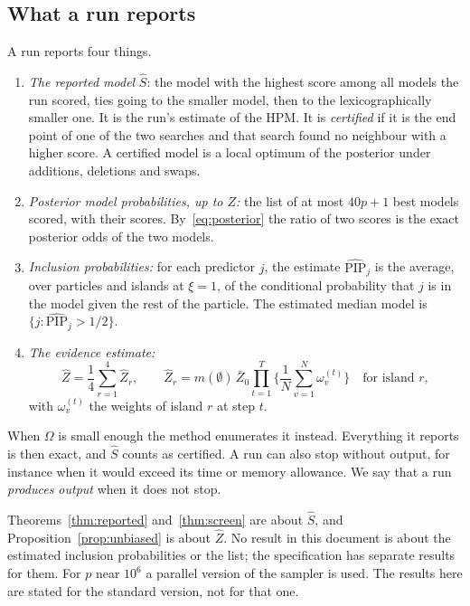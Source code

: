 \documentclass[11pt]{article}
\newcommand{\Om}{\Omega}
\newcommand{\PIP}{\mathrm{PIP}}
\newcommand{\HPM}{\mathrm{HPM}}
\newcommand{\Shat}{\hat S}
\newcommand{\Zhat}{\hat Z}
\theoremstyle{plain}
\theoremstyle{definition}
\begin{document}
\subsection{What a run reports}\label{sec:outputs}

A run reports four things.
\begin{enumerate}[label=(\roman*)]
  \item \emph{The reported model} $\Shat$: the model with the highest score among all models the run scored, ties going
    to the smaller model, then to the lexicographically smaller one. It is the run's estimate of the $\HPM$. It is \emph{certified} if it is the end point of one of
    the two searches and that search found no neighbour with a higher score. A certified model is a local optimum of
    the posterior under additions, deletions and swaps.
  \item \emph{Posterior model probabilities, up to $Z$:} the list of at most $40p+1$ best models scored, with their scores.
    By~\eqref{eq:posterior} the ratio of two scores is the exact posterior odds of the two models.
  \item \emph{Inclusion probabilities:} for each predictor $j$, the estimate $\widehat{\PIP}_j$ is the average, over
    particles and islands at $\xi=1$, of the conditional probability that $j$ is in the model given the rest of the
    particle. The estimated median model is $\{j:\widehat{\PIP}_j>1/2\}$.
  \item \emph{The evidence estimate:}
    \begin{equation}\label{eq:zhat}
      \Zhat=\frac14\sum_{r=1}^{4}\Zhat_r,\qquad
      \Zhat_r=m(\emptyset)\,\bar Z_0\prod_{t=1}^{T}\Big\{\frac1N\sum_{v=1}^N\omega^{(t)}_v\Big\}\quad\text{for island }r,
    \end{equation}
    with $\omega^{(t)}_v$ the weights of island $r$ at step $t$.
\end{enumerate}
When $\Om$ is small enough the method enumerates it instead. Everything it reports is then exact, and $\Shat$ counts as
certified. A run can also stop without output, for instance when it would exceed its time or memory allowance. We say
that a run \emph{produces output} when it does not stop.

Theorems~\ref{thm:reported} and~\ref{thm:screen} are about $\Shat$, and Proposition~\ref{prop:unbiased} is about
$\Zhat$. No result in this document is about the estimated inclusion probabilities or the list; the specification has
separate results for them. For $p$ near $10^6$ a parallel version of the sampler is used. The results here are stated
for the standard version, not for that one.
\end{document}
